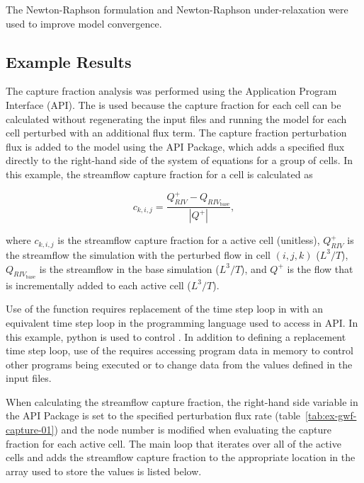 The Newton-Raphson formulation and Newton-Raphson under-relaxation were used to improve model convergence.


\subsection{Example Results}

The capture fraction analysis was performed using the \MF Application Program Interface (API). The \mfapi is used because the capture fraction for each cell can be calculated without regenerating the input files and running the model for each cell perturbed with an additional flux term. The capture fraction perturbation flux is added to the model using the API Package, which adds a specified flux directly to the right-hand side of the system of equations for a group of cells. In this example, the streamflow capture fraction for a cell is calculated as

\begin{equation}
	\label{eq:capture-fraction}
	c_{k,i,j} = \frac{Q_{RIV}^{+} - Q_{{RIV}_{\text{base}}}}{|Q^{+}|} ,
\end{equation}

\noindent where $c_{k,i,j}$ is the streamflow capture fraction for a active cell (unitless), $Q_{RIV}^{+}$ is the streamflow the simulation with the perturbed flow in cell $(i,j,k)$ ($L^3/T$), $Q_{{RIV}_{\text{base}}}$ is the streamflow in the base simulation ($L^3/T$), and $Q^{+}$ is the flow that is incrementally added to each active cell  ($L^3/T$).

Use of the \mfapi function requires replacement of the time step loop in \MF with an equivalent time step loop in the programming language used to access in API. In this example, python is used to control \MF. In addition to defining a replacement time step loop, use of the \mfapi requires accessing program data in memory to control other programs being executed or to change \MF data from the values defined in the \MF input files. 

When calculating the streamflow capture fraction, the right-hand side variable in the API Package is set to the specified perturbation flux rate (table~\ref{tab:ex-gwf-capture-01}) and the node number is modified when evaluating the capture fraction for each active cell. The main loop that iterates over all of the active cells and adds the streamflow capture fraction  to the appropriate location in the array used to store the values is listed below.

